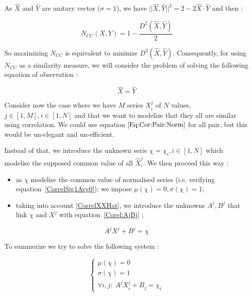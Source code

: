 As $\widehat {X}$ and $\widehat {Y}$ are unitary vector ($\sigma = 1$), we have
$||\widehat {X} ,\widehat {Y}||^2  = 2 - 2 \widehat {X} \cdot \widehat {Y} $ and then :


\begin{equation}
    N_{CC}(X,Y) = 1-\frac{ D^2(\widehat {X} ,\widehat {Y})}{2}
\end{equation}

So maximizing $N_{CC}$ is equivalent to mininize $ D^2(\widehat {X} ,\widehat {Y})$. Consequently,
for using  $N_{CC}$ as a similarity measure, we will consider the problem of  solving the following equation of observation :

\begin{equation}
    \widehat {X} =\widehat {Y} \label{Eq:Cor:Pair:Norm}
\end{equation}

Consider now the case where we have $M$ series $X^j_i$ of $N$ values, $j \in [1,M], i \in [1,N]$
and that we want to modelize that they all are similar using correlation. We could use
equation $\ref{Eq:Cor:Pair:Norm}$ for all pair, but this would be un-elegant and un-efficient.

Instead of that, we introduce the unknown serie $\chi = \chi_i, i \in [1,N]$ which modelise the supposed common value
of all $\widehat X^j_i$. We then proceed this way :

\begin{itemize}
    \item as $\chi$ modelise the common value of normalised series (i.e. verifying equation~\ref{CorrelSig1Avg0});
          we impose $\mu(\chi)=0, \sigma(\chi)=1$;
    \item taking into account \ref{CorrelXXHat},  we introduce the unknowns $A^j,B^j$
          that link $\chi$ and $X^j$ with equation~\ref{Corel:AjBj} ;
\end{itemize}

\begin{equation}
	A^j X^j + B^j = \chi \label{Corel:AjBj}
\end{equation}

To summerize we try to solve the following system :

\begin{equation}
\left\{ \begin{array}{rc|l}
     \mu(\chi) = 0         \\ 
     \sigma(\chi) = 1         \\ 
      \forall i,j : \;  A^j X^j_i + B_j = \chi _i
\end{array}\right.
\label{XXXXX}
\end{equation}


